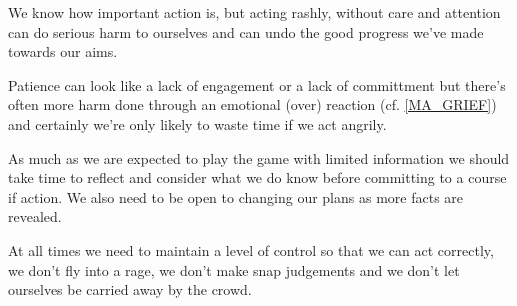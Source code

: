 \cleardoublepage
\begin{multicols}{2}

We know how important action is, but acting rashly, without care and attention can do serious harm to ourselves and can undo the good progress we've made towards our aims.

Patience can look like a lack of engagement or a lack of committment but there's often more harm done through an emotional (over) reaction (cf. \ref{MA_GRIEF}) and certainly we're only likely to waste time if we act angrily.

As much as we are expected to play the game with limited information we should take time to reflect and consider what we do know before committing to a course if action. We also need to be open to changing our plans as more facts are revealed. 

At all times we need to maintain a level of control so that we can act correctly, we don't fly into a rage, we don't make snap judgements and we don't let ourselves be carried away by the crowd.

\end{multicols}
\clearpage
